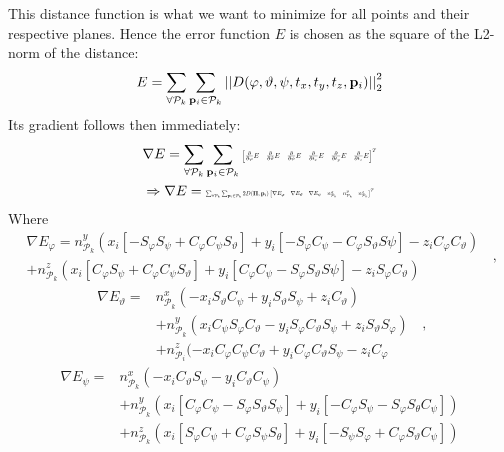 This distance function is what we want to minimize for all points and their respective planes.
Hence the error function $E$ is chosen as the square of the L2-norm of the distance:
\begin{align}
	E = \sum_{\forall \mathcal{P}_k}\sum_{\vec{p}_i \in \mathcal{P}_k} \norm[2]{D(\varphi,\vartheta,\psi,t_x,t_y,t_z, \vec{p}_i)}^2
\end{align}
Its gradient follows then immediately:
\begin{align}
	&\nabla E =  \sum_{\forall \mathcal{P}_k}\sum_{\vec{p}_i \in \mathcal{P}_k} \resizebox{0.28\textwidth}{!}{$\begin{bmatrix}\pardiff{\varphi} E&\pardiff{\vartheta} E&\pardiff{\psi} E&\pardiff{t_x} E&\pardiff{t_y} E&\pardiff{t_z} E\end{bmatrix}^T$}\\
    &\Rightarrow\nabla E = \resizebox{0.35\textwidth}{!}{$\sum_{\forall \mathcal{P}_k} \sum_{\vec{p}_i\in \mathcal{P}_k}2D(\vec{\Pi}, \vec{p}_i)\begin{bmatrix}\nabla E_\varphi &\nabla E_\vartheta & \nabla E_\psi & n_{\mathcal{P}_k}^x&n_{\mathcal{P}_k}^y&n_{\mathcal{P}_k}^z\end{bmatrix}^T$}
\end{align}
Where
\begin{equation}
\begin{split}
\nabla E_\varphi = n_{\mathcal{P}_k}^y(x_i[-S_\varphi S_\psi+C_\varphi C_\psi S_\vartheta]+y_i[-S_\varphi C_\psi -C_\varphi S_\vartheta S\psi] - z_i C_\varphi C_\vartheta)\\
        + n_{\mathcal{P}_k}^z(x_i[C_\varphi S_\psi+C_\varphi C_\psi S_\vartheta] +y_i[C_\varphi C_\psi -S_\varphi S_\vartheta S\psi] - z_i S_\varphi C_\vartheta)
\end{split} \;\; ,
\end{equation}
\begin{equation}
\begin{split}
 \nabla E_\vartheta = & n_{\mathcal{P}_k}^x(-x_iS_\vartheta C_\psi + y_i S_\vartheta S_\psi + z_iC_\vartheta) \\
        &+ n_{\mathcal{P}_k}^y(x_iC_\psi S_\varphi C_\vartheta - y_iS_\varphi C_\vartheta S_\psi + z_i S_\vartheta S_\varphi)  \\
        &+ n_{\mathcal{P}_i}^z(-x_iC_\varphi C_\psi C_\vartheta + y_iC_\varphi C_\vartheta S_\psi - z_i C_\varphi 
\end{split}
\;\; ,
\end{equation} 
\begin{equation}
\begin{split}
	\nabla E_\psi = &n_{\mathcal{P}_k}^x\left(-x_iC_\vartheta S_\psi - y_iC_\vartheta C_\psi\right) \\
       &+ n_{\mathcal{P}_k}^y(x_i[C_\varphi C_\psi - S_\varphi S_\vartheta S_\psi] 
       + y_i[-C_\varphi S_\psi - S_\varphi S_\theta C_\psi]) \\
       &+ n_{\mathcal{P}_k}^z(x_i[S_\varphi C_\psi + C_\varphi S_\psi S_\theta] 
       + y_i[-S_\psi S_ \varphi + C_\varphi S_\vartheta C_\psi]) 
\end{split}
\end{equation}
